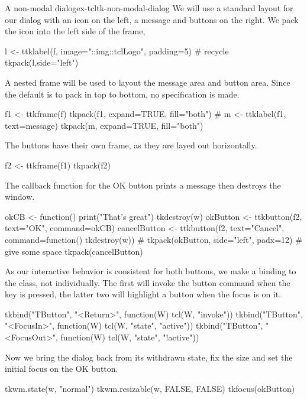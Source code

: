 \begin{example}{A non-modal dialog}{ex-tcltk-non-modal-dialog}
We will use a standard layout for our dialog with an icon on the left,
a message and buttons on the right. We pack the icon into the left side of the frame,
\begin{Schunk}
\begin{Sinput}
 l <- ttklabel(f, image="::img::tclLogo", padding=5) # recycle
 tkpack(l,side="left")
\end{Sinput}
\end{Schunk}

A nested frame will be used to layout the message area and button area. Since the  default is to pack in top to bottom, no  specification is made.
\begin{Schunk}
\begin{Sinput}
 f1 <- ttkframe(f)
 tkpack(f1, expand=TRUE, fill="both")
 #
 m <- ttklabel(f1, text=message)
 tkpack(m, expand=TRUE, fill="both")
\end{Sinput}
\end{Schunk}

The buttons have their own frame, as they are layed out horizontally. 
\begin{Schunk}
\begin{Sinput}
 f2 <- ttkframe(f1)
 tkpack(f2)
\end{Sinput}
\end{Schunk}
%
The callback function for the OK button prints a message then destroys the window.
\begin{Schunk}
\begin{Sinput}
 okCB <- function() {
   print("That's great")
   tkdestroy(w)
 }
 okButton <- ttkbutton(f2, text="OK", command=okCB)
 cancelButton <- ttkbutton(f2, text="Cancel", 
                           command=function() tkdestroy(w))
 #
 tkpack(okButton, side="left", padx=12)  # give some space
 tkpack(cancelButton)
\end{Sinput}
\end{Schunk}
%

As our interactive behavior is consistent for both buttons, we make a
binding to the  class, not individually. The first will
invoke the button command when the  key is pressed, the
latter two will highlight a button when the focus is on it.
\begin{Schunk}
\begin{Sinput}
 tkbind("TButton", "<Return>", function(W) tcl(W, "invoke"))
 tkbind("TButton", "<FocusIn>", function(W) 
        tcl(W, "state", "active"))
 tkbind("TButton", "<FocusOut>", function(W) 
        tcl(W, "state", "!active"))
\end{Sinput}
\end{Schunk}
%
Now we bring the dialog back from its withdrawn state, fix the size
and set the initial focus on the OK button.
\begin{Schunk}
\begin{Sinput}
 tkwm.state(w, "normal")
 tkwm.resizable(w, FALSE, FALSE)
 tkfocus(okButton)
\end{Sinput}
\end{Schunk}
\end{example}


